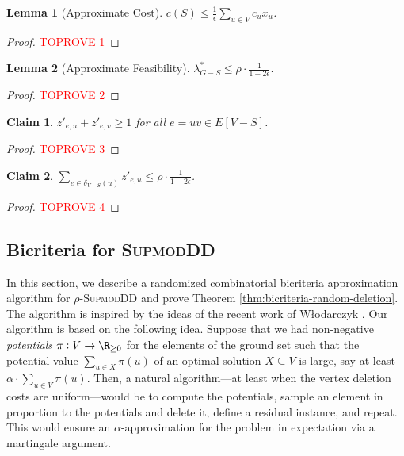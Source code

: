 \documentclass{article}
\newtheorem{lemma}{Lemma}[section]
\newtheorem{claim}{Claim}[section]
\newcommand{\supmoddensitydeletionset}{\textsc{SupmodDD}\xspace}
\begin{document}
\begin{lemma}[Approximate Cost] \label{lem:bicriteria-LP-rounding:cost}
$c(S) \leq \frac{1}{\epsilon}\sum_{u \in V}c_ux_u$.
\end{lemma}
\begin{proof}\textcolor{red}{TOPROVE 1}\end{proof}

\begin{lemma}[Approximate Feasibility] \label{lem:bicriteria-LP-rounding:approximate-feasibility}
    $\lambda^*_{G - S} \leq \rho\cdot \frac{1}{1 - 2\epsilon}$.
\end{lemma}
\begin{proof}\textcolor{red}{TOPROVE 2}\end{proof}
    \begin{claim}
        $z'_{e, u} + z'_{e,v} \geq 1$ for all $e = uv \in E[V - S]$.
    \end{claim}
    \begin{proof}\textcolor{red}{TOPROVE 3}\end{proof}

    \begin{claim}
        $\sum_{e \in \delta_{V - S}(u)}z'_{e, u} \leq \rho\cdot\frac{1}{1-2\epsilon}$.
    \end{claim}
    \begin{proof}\textcolor{red}{TOPROVE 4}\end{proof}

\subsection{Bicriteria for \supmoddensitydeletionset}\label{sec:supmodDD-bicriteria}

In this section, we describe a randomized combinatorial bicriteria approximation algorithm for $\rho$-\supmoddensitydeletionset and prove Theorem \ref{thm:bicriteria-random-deletion}. 
 The algorithm is inspired by the ideas of the recent work of Włodarczyk \cite{Włodarczyk_2024}.
Our algorithm is based on the following  idea.  Suppose that we had 
non-negative \emph{potentials} $\pi:V\rightarrow\R_{\geq 0}$ for the elements of the ground set   
such that the potential value $\sum_{u\in X}\pi(u)$ of an optimal solution $X \subseteq V$ is large, say at least $\alpha\cdot\sum_{u \in V}\pi(u)$.
Then, a natural algorithm---at least when the vertex deletion costs are uniform---would be to 
compute the potentials, 
sample an element in proportion to the potentials and delete it, define a residual instance, and repeat. 
This would ensure an $\alpha$-approximation for the problem in expectation via a martingale argument.
\end{document}
